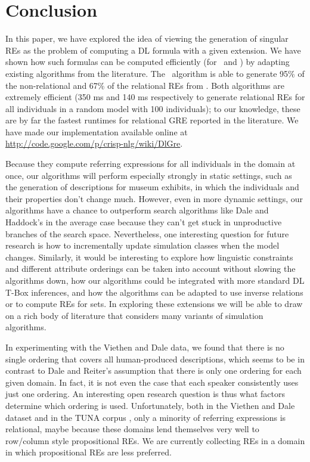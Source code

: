 \section{Conclusion} \label{sec:conclusion}

In this paper, we have explored the idea of viewing the generation of
singular REs as the problem of computing a DL formula with a given
extension.  We have shown how such formulas can be computed
efficiently (for \alc\ and \el) by adapting existing algorithms from
the literature.  The \el\ algorithm is able to generate 95\% of the
non-relational and 67\% of the relational REs from
.  Both algorithms
are extremely efficient (350 ms and 140 ms respectively to generate
relational REs for all individuals in a random model with 100
individuals); to our knowledge, these are by far the fastest runtimes
for relational GRE reported in the literature.  We have made our
implementation available online at
\url{http://code.google.com/p/crisp-nlg/wiki/DlGre}.

Because they compute referring expressions for all individuals in the
domain at once, our algorithms will perform especially strongly in
static settings, such as the generation of descriptions for museum
exhibits, in which the individuals and their properties don't change
much.  However, even in more dynamic settings, our algorithms have a
chance to outperform search algorithms like Dale and Haddock's in the
average case because they can't get stuck in unproductive branches of
the search space. Nevertheless, one interesting question for future
research is how to incrementally update simulation classes when the
model changes. Similarly, it would be interesting to explore how
linguistic constraints and different attribute orderings can be taken
into account without slowing the algorithms down, how our algorithms
could be integrated with more standard DL T-Box inferences, and how the
algorithms can be adapted to use inverse relations or to compute REs
for sets. In exploring these extensions we will be able to draw on a
rich body of literature that considers many variants of simulation
algorithms.

In experimenting with the Viethen and Dale data, we found that there
is no single ordering that covers all human-produced descriptions,
which seems to be in contrast to Dale and Reiter's
 assumption that there is only one ordering for
each given domain.  In fact, it is not even the case that each speaker
consistently uses just one ordering.  An interesting open research
question is thus what factors determine which ordering is used.
Unfortunately, both in the Viethen and Dale dataset and in the TUNA
corpus \cite{deemter06:_build_seman_trans_corpus_for}, only a minority
of referring expressions is relational, maybe because these domains
lend themselves very well to row/column style propositional REs.  We
are currently collecting REs in a domain in which propositional REs
are less preferred.

